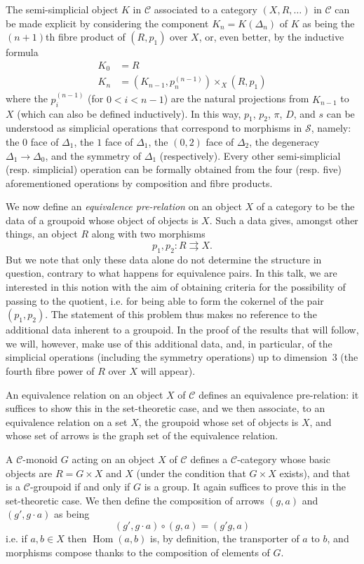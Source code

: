 \documentclass{article}
\renewcommand{\cal}[1]{{\mathcal{#1}}}
\DeclareMathOperator{\Hom}{Hom}
\newcommand{\oldpage}[1]{\marginpar{\footnotesize$\Big\vert$ \textit{p.~#1}}}
\begin{document}
The semi-simplicial object $K$ in $\cal{C}$ associated to a category $(X,R,\ldots)$ in $\cal{C}$ can be made explicit by considering the component $K_n=K(\Delta_n)$ of $K$ as being the $(n+1)$th fibre product of $(R,p_1)$ over $X$, or, even better, by the inductive formula
\[
  \begin{aligned}
    K_0 &= R
  \\K_n &= (K_{n-1},p_n^{(n-1)})\times_X(R,p_1)
  \end{aligned}
\]
where the $p_i^{(n-1)}$ (for $0<i<n-1$) are the natural projections from $K_{n-1}$ to $X$ (which can also be defined inductively).
In this way, $p_1$, $p_2$, $\pi$, $D$, and $s$ can be understood as simplicial operations that correspond to morphisms in $\cal{S}$, namely: the $0$ face of $\Delta_1$, the $1$ face of $\Delta_1$, the $(0,2)$ face of $\Delta_2$, the degeneracy $\Delta_1\to\Delta_0$, and the symmetry of $\Delta_1$ (respectively).
Every other semi-simplicial (resp. simplicial) operation can be formally obtained from the four (resp. five) aforementioned operations by composition and fibre products.

We now define an \emph{equivalence pre-relation} on an object $X$ of a category to be the data of a groupoid whose object of objects is $X$.
Such a data gives, amongst other things, an object $R$ along with two morphisms
\[
  p_1,p_2\colon R\rightrightarrows X.
\]
But we note that only these data alone do not determine the structure in question, contrary to what happens for equivalence pairs.
In this talk, we are interested in this notion with the aim of obtaining criteria for the possibility of passing to the quotient, i.e. for being able to form the cokernel of the pair $(p_1,p_2)$.
The statement of this problem thus makes no reference to the additional data inherent to a groupoid.
In the proof of the results that will follow, we will,
\oldpage{212-12}
however, make use of this additional data, and, in particular, of the simplicial operations (including the symmetry operations) up to dimension~$3$ (the fourth fibre power of $R$ over $X$ will appear).

An equivalence relation on an object $X$ of $\cal{C}$ defines an equivalence pre-relation: it suffices to show this in the set-theoretic case, and we then associate, to an equivalence relation on a set $X$, the groupoid whose set of objects is $X$, and whose set of arrows is the graph set of the equivalence relation.

A $\cal{C}$-monoid $G$ acting on an object $X$ of $\cal{C}$ defines a $\cal{C}$-category whose basic objects are $R=G\times X$ and $X$ (under the condition that $G\times X$ exists), and that is a $\cal{C}$-groupoid if and only if $G$ is a group.
It again suffices to prove this in the set-theoretic case.
We then define the composition of arrows $(g,a)$ and $(g',g\cdot a)$ as being
\[
  (g',g\cdot a) \circ (g,a) = (g'g,a)
\]
i.e. if $a,b\in X$ then $\Hom(a,b)$ is, by definition, the transporter of $a$ to $b$, and morphisms compose thanks to the composition of elements of $G$.
\end{document}
